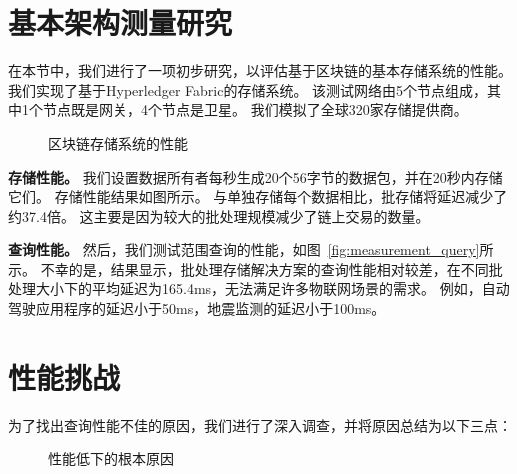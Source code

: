 \section{基本架构测量研究}
在本节中，我们进行了一项初步研究，以评估基于区块链的基本存储系统的性能。
我们实现了基于Hyperledger Fabric的存储系统。
该测试网络由5个节点组成，其中1个节点既是网关，4个节点是卫星。
我们模拟了全球320家存储提供商。
\begin{figure*}[t]
    \centering
    \begin{minipage}{0.8\linewidth}
	    \centering
        \hfill
        \caption{区块链存储系统的性能} 
    \end{minipage}
\end{figure*}

\textbf{存储性能。}
我们设置数据所有者每秒生成20个56字节的数据包，并在20秒内存储它们。
存储性能结果如图所示。
与单独存储每个数据相比，批存储将延迟减少了约37.4倍。
这主要是因为较大的批处理规模减少了链上交易的数量。

\textbf{查询性能。}
然后，我们测试范围查询的性能，如图~\autoref{fig:measurement_query}所示。
不幸的是，结果显示，批处理存储解决方案的查询性能相对较差，在不同批处理大小下的平均延迟为165.4ms，无法满足许多物联网场景的需求。
例如，自动驾驶应用程序的延迟小于50ms，地震监测的延迟小于100ms。

\section{性能挑战}
为了找出查询性能不佳的原因，我们进行了深入调查，并将原因总结为以下三点：

\begin{figure*}[t]
    \centering
    \begin{minipage}{1\linewidth}
	    \centering
        \hfill
        \hfill
        \caption{性能低下的根本原因} 
    \end{minipage}
\end{figure*}

